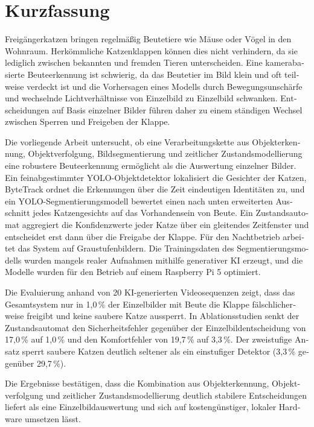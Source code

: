 \chapter{Kurzfassung}

\begin{german} %

Freigängerkatzen bringen regelmäßig Beutetiere wie Mäuse oder Vögel in den Wohnraum. Herkömmliche Katzenklappen können dies nicht verhindern, da sie lediglich zwischen bekannten und fremden Tieren unterscheiden. Eine kamerabasierte Beuteerkennung ist schwierig, da das Beutetier im Bild klein und oft teilweise verdeckt ist und die Vorhersagen eines Modells durch Bewegungsunschärfe und wechselnde Lichtverhältnisse von Einzelbild zu Einzelbild schwanken. Entscheidungen auf Basis einzelner Bilder führen daher zu einem ständigen Wechsel zwischen Sperren und Freigeben der Klappe.

Die vorliegende Arbeit untersucht, ob eine Verarbeitungskette aus Objekterkennung, Objektverfolgung, Bildsegmentierung und zeitlicher Zustandsmodellierung eine robustere Beuteerkennung ermöglicht als die Auswertung einzelner Bilder. Ein feinabgestimmter YOLO-Objektdetektor lokalisiert die Gesichter der Katzen, ByteTrack ordnet die Erkennungen über die Zeit eindeutigen Identitäten zu, und ein YOLO-Segmentierungsmodell bewertet einen nach unten erweiterten Ausschnitt jedes Katzengesichts auf das Vorhandensein von Beute. Ein Zustandsautomat aggregiert die Konfidenzwerte jeder Katze über ein gleitendes Zeitfenster und entscheidet erst dann über die Freigabe der Klappe. Für den Nachtbetrieb arbeitet das System auf Graustufenbildern. Die Trainingsdaten des Segmentierungsmodells wurden mangels realer Aufnahmen mithilfe generativer KI erzeugt, und die Modelle wurden für den Betrieb auf einem Raspberry Pi 5 optimiert.

Die Evaluierung anhand von 20 KI-generierten Videosequenzen zeigt, dass das Gesamtsystem nur in 1,0\,\% der Einzelbilder mit Beute die Klappe fälschlicherweise freigibt und keine saubere Katze aussperrt. In Ablationsstudien senkt der Zustandsautomat den Sicherheitsfehler gegenüber der Einzelbildentscheidung von 17,0\,\% auf 1,0\,\% und den Komfortfehler von 19,7\,\% auf 3,3\,\%. Der zweistufige Ansatz sperrt saubere Katzen deutlich seltener als ein einstufiger Detektor (3,3\,\% gegenüber 29,7\,\%).

Die Ergebnisse bestätigen, dass die Kombination aus Objekterkennung, Objektverfolgung und zeitlicher Zustandsmodellierung deutlich stabilere Entscheidungen liefert als eine Einzelbildauswertung und sich auf kostengünstiger, lokaler Hardware umsetzen lässt.
\end{german}
